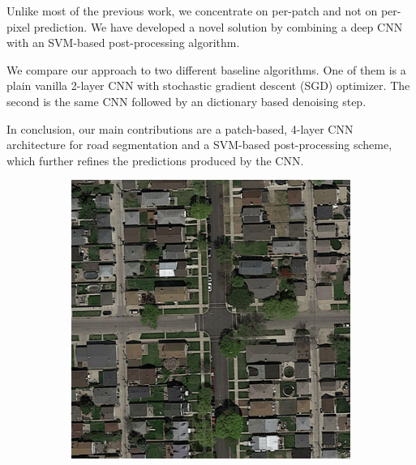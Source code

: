 \documentclass[10pt,conference,compsocconf]{IEEEtran}
\begin{document}
Unlike most of the previous work, we concentrate on per-patch and not on per-pixel prediction. We have developed a novel solution by combining a deep CNN with an SVM-based post-processing algorithm.

We compare our approach to two different baseline algorithms. One of them is a plain vanilla 2-layer CNN with stochastic gradient descent (SGD) optimizer. The second is the same CNN followed by an dictionary based denoising \cite{Elad.2006} step.

In conclusion, our main contributions are a patch-based, \mbox{4-layer} CNN architecture for road segmentation and a SVM-based post-processing scheme, which further refines the predictions produced by the CNN.

\begin{figure}
	\centering
	\begin{subfigure}{.2\textwidth}
		\includegraphics[width=1\textwidth]{figs/img1.png}
	\end{subfigure}
	\begin{subfigure}{.2\textwidth}

\end{subfigure}
\end{figure}
\end{document}
